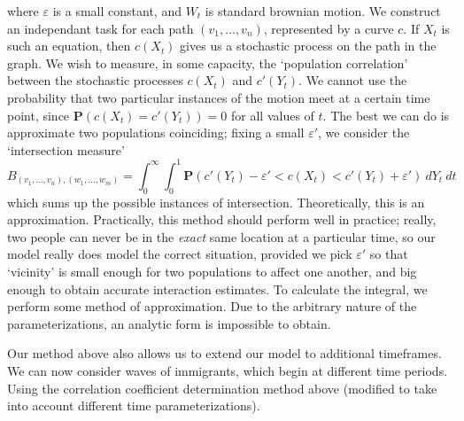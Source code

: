 \documentclass{article}
\begin{document}
%
where $\varepsilon$ is a small constant, and $W_t$ is standard brownian motion. We construct an independant task for each path $(v_1, \dots, v_n)$, represented by a curve $c$. If $X_t$ is such an equation, then $c(X_t)$ gives us a stochastic process on the path in the graph. We wish to measure, in some capacity, the `population correlation' between the stochastic processes $c(X_t)$ and $c'(Y_t)$. We cannot use the probability that two particular instances of the motion meet at a certain time point, since $\mathbf{P}(c(X_t) = c'(Y_t)) = 0$ for all values of $t$. The best we can do is approximate two populations coinciding; fixing a small $\varepsilon'$, we consider the `intersection measure'
%
\[ B_{(v_1, \dots, v_n), (w_1, \dots, w_m)} = \int_0^\infty \int_0^1 \mathbf{P}\left(c'(Y_t) - \varepsilon' < c(X_t) < c'(Y_t) + \varepsilon'\right)\ dY_t\ dt \]
%
which sums up the possible instances of intersection. Theoretically, this is an approximation. Practically, this method should perform well in practice; really, two people can never be in the {\it exact} same location at a particular time, so our model really does model the correct situation, provided we pick $\varepsilon'$ so that `vicinity' is small enough for two populations to affect one another, and big enough to obtain accurate interaction estimates. To calculate the integral, we perform some method of approximation. Due to the arbitrary nature of the parameterizations, an analytic form is impossible to obtain.

Our method above also allows us to extend our model to additional timeframes. We can now consider waves of immigrants, which begin at different time periods. Using the correlation coefficient determination method above (modified to take into account different time parameterizations).



\end{document}
